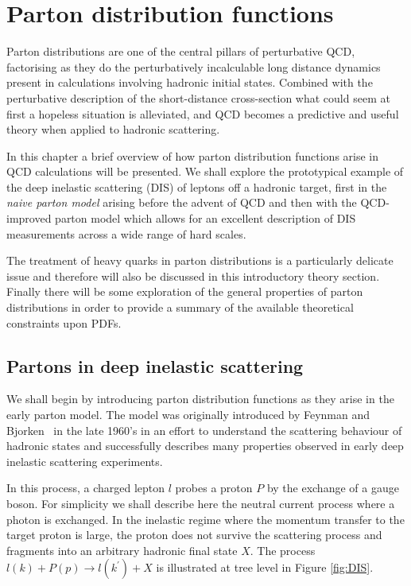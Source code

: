 \chapter{\label{chapter1} Parton distribution functions} 

Parton distributions are one of the central pillars of perturbative QCD, factorising as they do the perturbatively incalculable long distance dynamics present in calculations involving hadronic initial states. Combined with
the perturbative description of the short-distance cross-section what could seem at first a hopeless situation is alleviated, and QCD becomes a predictive and useful theory when applied to hadronic scattering.

In this chapter a brief overview of how parton distribution functions arise in QCD calculations will be presented.
We shall explore the prototypical example of the deep inelastic scattering (DIS) of leptons off a hadronic target, first in the \emph{naive parton model} arising before the advent of QCD and
then with the QCD-improved parton model which allows for an excellent description of DIS measurements across a wide range of hard scales.

The treatment of heavy quarks in parton distributions is a particularly delicate issue and therefore will
also be discussed in this introductory theory section. Finally there will be some exploration of the general properties of parton distributions in order to provide a summary of the available theoretical constraints upon PDFs.

\section{Partons in deep inelastic scattering}
We shall begin by introducing parton distribution functions as they arise in the early parton model. The model was originally introduced by Feynman and Bjorken~\cite{feynman1,Feynmanparton,feynmanparton2, Bjorken:1968dy} in the late 1960's in an effort to understand the scattering behaviour of hadronic states and successfully
describes many properties observed in early deep inelastic scattering experiments.

In this process, a charged lepton $l$ probes a proton $P$ by the exchange of a gauge boson. For simplicity we shall describe here the neutral current process where a photon is exchanged. In the inelastic regime where the momentum transfer to the target proton is large, the proton does
not survive the scattering process and fragments into an arbitrary hadronic final state $X$. The process $l(k) + P(p) \to l(k^\prime) + X$ is illustrated at tree level in Figure \ref{fig:DIS}. 

